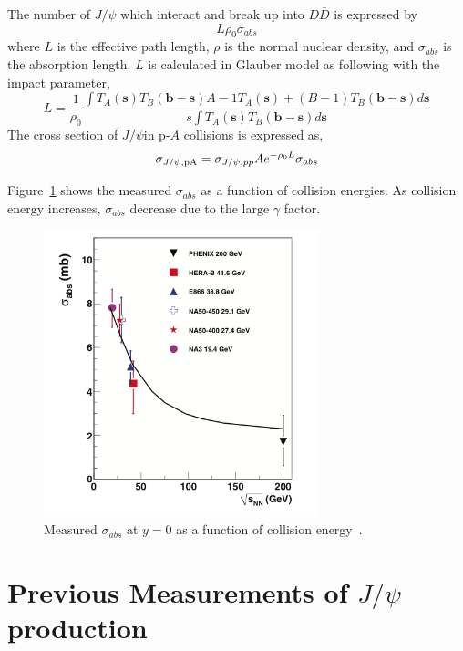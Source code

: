 The number of $J/\psi$ which interact and break up into $D\bar{D}$ is expressed by 
\begin{equation}
  L\rho_{0}\sigma_{abs}
\end{equation}
where $L$ is the effective path length, $\rho$ is the normal nuclear density, and $\sigma_{abs}$ is the absorption length. 
$L$ is calculated in Glauber model as following with the impact parameter, 
\begin{equation}
  L = \frac{1}{\rho_{0}}\frac{\int T_{A}(\bm{s})  T_{B}(\bm{b}-\bm{s}){A-1}T_{A}(\bm{s})+(B-1)T_{B}(\bm{b}-\bm{s}) d\bm{s} }
  {
    s\int T_{A}(\bm{s})T_{B}(\bm{b}-\bm{s})d\bm{s}    
  }
\end{equation}
The cross section of $J/\psi$in p-$A$ collisions is expressed as, 
\begin{equation}
	\sigma_{J/\psi , \rm{p}A} = \sigma_{J/\psi, pp}Ae^{-\rho_{0} L}\sigma_{abs}
\end{equation}

Figure~\ref{fig_2_sigmaabs} shows the measured $\sigma_{abs}$ as a function of collision energies\cite{bib_crosstime}. 
As collision energy increases, $\sigma_{abs}$ decrease due to the large $\gamma$ factor. 
\begin{figure}[!h]
  \begin{center}
    \includegraphics[width=8cm]{chap2/figure/experimentaldata/sigmaabs.png}
  \end{center}
  \caption{
    Measured $\sigma_{abs}$ at $y=0$ as a function of collision energy~\cite{bib_crosstime}. }
  \label{fig_2_sigmaabs}
\end{figure}



\section{Previous Measurements of $J/\psi$ production}




